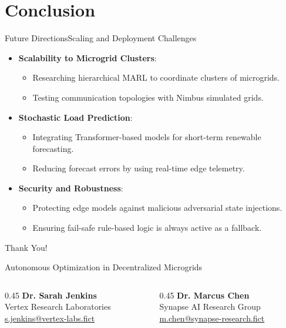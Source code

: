 \section{Conclusion}

\begin{frame}{Future Directions}{Scaling and Deployment Challenges}
  \begin{itemize}[<+->]
    \item \textbf{Scalability to Microgrid Clusters}:
      \begin{itemize}
        \item Researching hierarchical MARL to coordinate clusters of microgrids.
        \item Testing communication topologies with Nimbus simulated grids.
      \end{itemize}
    \item \textbf{Stochastic Load Prediction}:
      \begin{itemize}
        \item Integrating Transformer-based models for short-term renewable forecasting.
        \item Reducing forecast errors by using real-time edge telemetry.
      \end{itemize}
    \item \textbf{Security and Robustness}:
      \begin{itemize}
        \item Protecting edge models against malicious adversarial state injections.
        \item Ensuring fail-safe rule-based logic is always active as a fallback.
      \end{itemize}
  \end{itemize}
\end{frame}

\begin{frame}[plain]
  \centering
  \vspace{1.5cm}
  {\Huge \color{VertexBlue} Thank You!}
  
  \vspace{1.0cm}
  {\large Autonomous Optimization in Decentralized Microgrids}
  
  \vspace{1.5cm}
  \begin{columns}[T]
    \begin{column}{0.45\textwidth}
      \centering
      \textbf{Dr. Sarah Jenkins} \\
      \small Vertex Research Laboratories \\
      \href{mailto:s.jenkins@vertex-labs.fict}{s.jenkins@vertex-labs.fict}
    \end{column}
    \begin{column}{0.45\textwidth}
      \centering
      \textbf{Dr. Marcus Chen} \\
      \small Synapse AI Research Group \\
      \href{mailto:m.chen@synapse-research.fict}{m.chen@synapse-research.fict}
    \end{column}
  \end{columns}
\end{frame}
